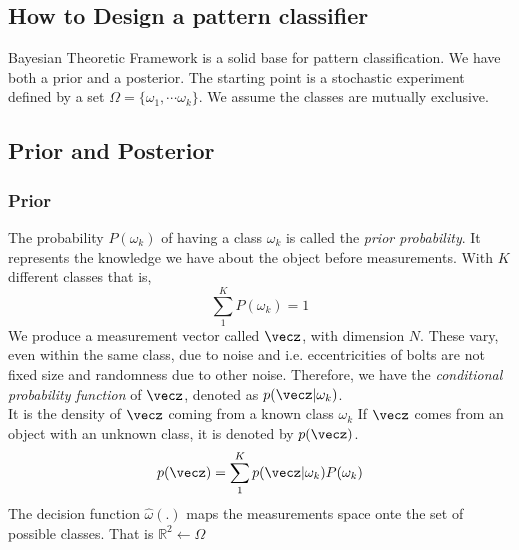 \subsection{How to Design a pattern classifier}
Bayesian Theoretic Framework is a solid base for pattern classification. We have both a prior and a posterior.
The starting point is a stochastic experiment defined by a set $\Omega = \{\omega_1,\cdots\omega_k\}$. We assume the classes are mutually exclusive.
\subsection{Prior and Posterior}
\label{sub:Prior_and_Posterior}
\subsubsection{Prior}
\label{sub:Prior}
The probability $P(\omega_k)$ of having a class $\omega_k$ is called the \textit{prior probability}. It represents the knowledge we have about the object before measurements. With $K$ different classes that is,
\begin{equation}
    \sum_1^K P({\omega_k}) = 1
\end{equation}
\newline
We produce a measurement vector called $\vecz$, with dimension $N$. These vary, even within the same class, due to noise and i.e. eccentricities of bolts are not fixed size and randomness due to other noise. Therefore, we have the \textit{conditional probability function} of $\vecz$, denoted as $p(\vecz|\omega_k)$.\\
It is the density of $\vecz$ coming from a known class $\omega_k$\newline
If $\vecz$ comes from an object with an unknown class, it is denoted by $p(\vecz)$.
\begin{equation}
    p(\vecz) = \sum_1^K p(\vecz|\omega_k)P(\omega_k)
\end{equation}
The decision function $\hat\omega(.)$ maps the measurements space onte the set of possible classes.
That is
$\mathbb{R}^2 \leftarrow \Omega$






\label{task:20140926_jm1}

